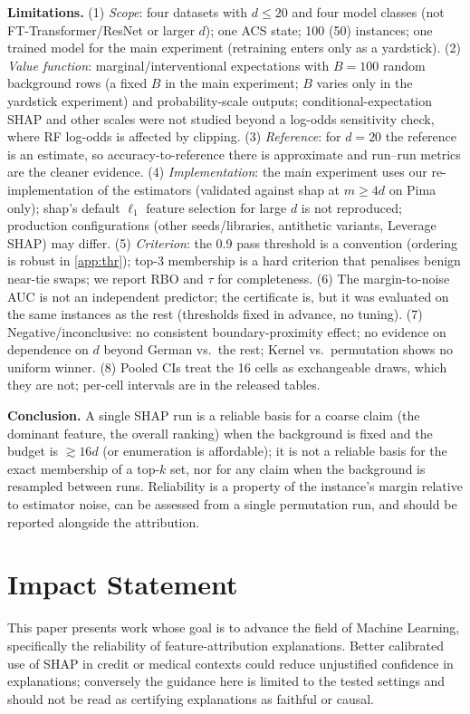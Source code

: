 \documentclass{article}
\begin{document}
\textbf{Limitations.} (1) \emph{Scope}: four datasets with $d\le20$ and four model classes (not FT-Transformer/ResNet \citep{gorishniy2021} or larger $d$); one ACS state; 100 (50) instances; one trained model for the main experiment (retraining enters only as a yardstick). (2) \emph{Value function}: marginal/interventional expectations with $B{=}100$ random background rows (a fixed $B$ in the main experiment; $B$ varies only in the yardstick experiment) and probability-scale outputs; conditional-expectation SHAP and other scales were not studied beyond a log-odds sensitivity check, where RF log-odds is affected by clipping. (3) \emph{Reference}: for $d{=}20$ the reference is an estimate, so accuracy-to-reference there is approximate and run--run metrics are the cleaner evidence. (4) \emph{Implementation}: the main experiment uses our re-implementation of the estimators (validated against shap at $m\ge4d$ on Pima only); shap's default $\ell_1$ feature selection for large $d$ is not reproduced; production configurations (other seeds/libraries, antithetic variants, Leverage SHAP) may differ. (5) \emph{Criterion}: the 0.9 pass threshold is a convention (ordering is robust in \cref{app:thr}); top-3 membership is a hard criterion that penalises benign near-tie swaps; we report RBO and $\tau$ for completeness. (6) The margin-to-noise AUC is not an independent predictor; the certificate is, but it was evaluated on the same instances as the rest (thresholds fixed in advance, no tuning). (7) Negative/inconclusive: no consistent boundary-proximity effect; no evidence on dependence on $d$ beyond German vs.\ the rest; Kernel vs.\ permutation shows no uniform winner. (8) Pooled CIs treat the 16 cells as exchangeable draws, which they are not; per-cell intervals are in the released tables.

\textbf{Conclusion.} A single SHAP run is a reliable basis for a coarse claim (the dominant feature, the overall ranking) when the background is fixed and the budget is $\gtrsim16d$ (or enumeration is affordable); it is not a reliable basis for the exact membership of a top-$k$ set, nor for any claim when the background is resampled between runs. Reliability is a property of the instance's margin relative to estimator noise, can be assessed from a single permutation run, and should be reported alongside the attribution.

\section*{Impact Statement}
This paper presents work whose goal is to advance the field of Machine Learning, specifically the reliability of feature-attribution explanations. Better calibrated use of SHAP in credit or medical contexts could reduce unjustified confidence in explanations; conversely the guidance here is limited to the tested settings and should not be read as certifying explanations as faithful or causal.
\end{document}
